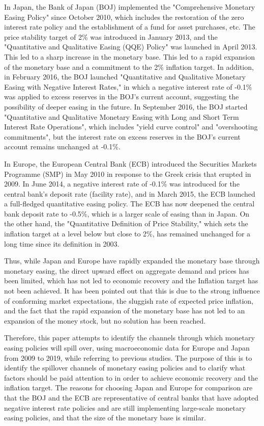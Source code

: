 \documentclass[12pt]{article}
\begin{document}
In Japan, the Bank of Japan (BOJ) implemented the "Comprehensive Monetary Easing Policy" since October 2010, which includes the restoration of the zero interest rate policy and the establishment of a fund for asset purchases, etc.
The price stability target of 2\% was introduced in January 2013, and the "Quantitative and Qualitative Easing (QQE) Policy" was launched in April 2013. This led to a sharp increase in the monetary base.
This led to a rapid expansion of the monetary base and a commitment to the 2\% inflation target.
In addition, in February 2016, the BOJ launched "Quantitative and Qualitative Monetary Easing with Negative Interest Rates," in which a negative interest rate of -0.1\% was applied to excess reserves in the BOJ's current account, suggesting the possibility of deeper easing in the future.
In September 2016, the BOJ started "Quantitative and Qualitative Monetary Easing with Long and Short Term Interest Rate Operations", which includes "yield curve control" and "overshooting commitments", but the interest rate on excess reserves in the BOJ's current account remains unchanged at -0.1\%.

In Europe, the European Central Bank (ECB) introduced the Securities Markets Programme (SMP) in May 2010 in response to the Greek crisis that erupted in 2009.
In June 2014, a negative interest rate of -0.1\% was introduced for the central bank's deposit rate (facility rate), and in March 2015, the ECB launched a full-fledged quantitative easing policy.
The ECB has now deepened the central bank deposit rate to -0.5\%, which is a larger scale of easing than in Japan.
On the other hand, the "Quantitative Definition of Price Stability," which sets the inflation target at a level below but close to 2\%, has remained unchanged for a long time since its definition in 2003.

Thus, while Japan and Europe have rapidly expanded the monetary base through monetary easing, the direct upward effect on aggregate demand and prices has been limited, which has not led to economic recovery and the Inflation target has not been achieved.
It has been pointed out that this is due to the strong influence of conforming market expectations, the sluggish rate of expected price inflation, and the fact that the rapid expansion of the monetary base has not led to an expansion of the money stock, but no solution has been reached.

Therefore, this paper attempts to identify the channels through which monetary easing policies will spill over, using macroeconomic data for Europe and Japan from 2009 to 2019, while referring to previous studies.
The purpose of this is to identify the spillover channels of monetary easing policies and to clarify what factors should be paid attention to in order to achieve economic recovery and the inflation target.
The reasons for choosing Japan and Europe for comparison are that the BOJ and the ECB are representative of central banks that have adopted negative interest rate policies and are still implementing large-scale monetary easing policies, and that the size of the monetary base is similar.
\end{document}
